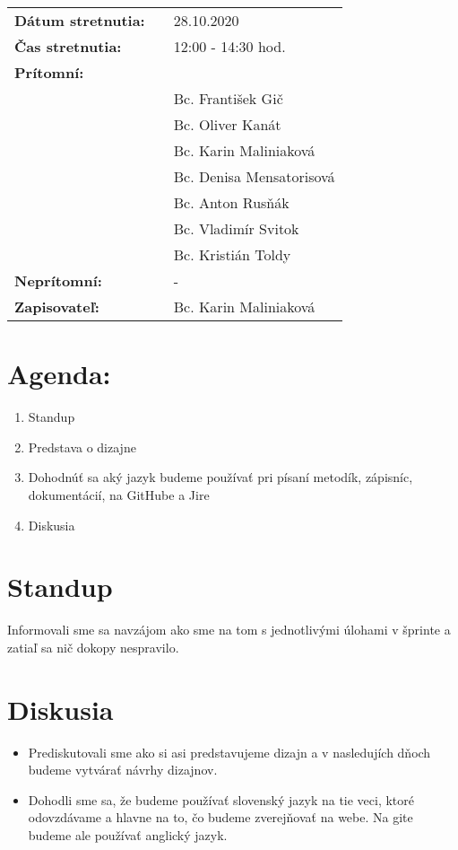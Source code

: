 \documentclass{article}
\begin{document}
    

    \begin{table}[h]
        \begin{tabular}{lllll}
            \multicolumn{3}{l}{\textbf{Dátum stretnutia:}} & & 28.10.2020 \\
            \multicolumn{3}{l}{\textbf{Čas stretnutia:}} & & 12:00 - 14:30 hod. \\
            \multicolumn{3}{l}{\textbf{Prítomní:}} \\
            & & & & Bc. František Gič  \\
            & & & & Bc. Oliver Kanát \\
            & & & & Bc. Karin Maliniaková \\
            & & & & Bc. Denisa Mensatorisová \\
            & & & & Bc. Anton Rusňák \\
            & & & & Bc. Vladimír Svitok \\
            & & & & Bc. Kristián Toldy \\
            \multicolumn{3}{l}{\textbf{Neprítomní:}} & & -\\
            \multicolumn{3}{l}{\textbf{Zapisovateľ:}} & & Bc. Karin Maliniaková \\
        \end{tabular}
        \label{tab:grades}
    \end{table}

    \section*{Agenda:}

    \begin{enumerate}
        \item Standup
        \item Predstava o dizajne
        \item Dohodnúť sa aký jazyk budeme používať pri písaní metodík, zápisníc, dokumentácií, na GitHube a Jire
        \item Diskusia
    \end{enumerate}

    \section*{Standup}

    \textnormal {Informovali sme sa navzájom ako sme na tom s jednotlivými úlohami v šprinte a zatiaľ sa nič dokopy nespravilo.}

    \section*{Diskusia}

    \begin{itemize}
        \item Prediskutovali sme ako si asi predstavujeme dizajn a v nasledujích dňoch budeme vytvárať návrhy dizajnov. 
        \item Dohodli sme sa, že budeme používať slovenský jazyk na tie veci, ktoré odovzdávame a hlavne na to, čo budeme zverejňovať na webe. Na gite budeme ale používať anglický jazyk. 
    \end{itemize}
\end{document}
